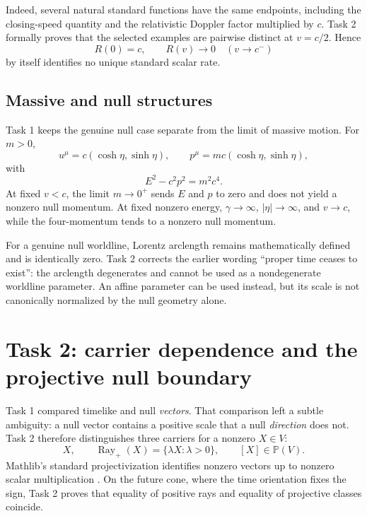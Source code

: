 \documentclass[11pt,a4paper]{article}
\newcommand{\Rayp}{\operatorname{Ray}_{+}}
\begin{document}
Indeed, several natural standard functions have the same endpoints, including the closing-speed quantity and the relativistic Doppler factor multiplied by $c$.  Task 2 formally proves that the selected examples are pairwise distinct at $v=c/2$.  Hence
\begin{equation}
 R(0)=c,
 \qquad
 R(v)\to0\quad(v\to c^-)
\end{equation}
by itself identifies no unique standard scalar rate.

\subsection{Massive and null structures}

Task 1 keeps the genuine null case separate from the limit of massive motion.  For $m>0$,
\begin{equation}
 u^\mu=c(\cosh\eta,\sinh\eta),
 \qquad
 p^\mu=mc(\cosh\eta,\sinh\eta),
\end{equation}
with
\begin{equation}
 E^2-c^2p^2=m^2c^4.
\end{equation}
At fixed $v<c$, the limit $m\to0^+$ sends $E$ and $p$ to zero and does not yield a nonzero null momentum.  At fixed nonzero energy, $\gamma\to\infty$, $|\eta|\to\infty$, and $v\to c$, while the four-momentum tends to a nonzero null momentum.

For a genuine null worldline, Lorentz arclength remains mathematically defined and is identically zero.  Task 2 corrects the earlier wording ``proper time ceases to exist'': the arclength degenerates and cannot be used as a nondegenerate worldline parameter.  An affine parameter can be used instead, but its scale is not canonically normalized by the null geometry alone.

\section{Task 2: carrier dependence and the projective null boundary}

Task 1 compared timelike and null \emph{vectors}.  That comparison left a subtle ambiguity: a null vector contains a positive scale that a null \emph{direction} does not.  Task 2 therefore distinguishes three carriers for a nonzero $X\in V$:
\begin{equation}
 X,
 \qquad
 \Rayp(X)=\{\lambda X:\lambda>0\},
 \qquad
 [X]\in\mathbb P(V).
\end{equation}
Mathlib's standard projectivization identifies nonzero vectors up to nonzero scalar multiplication \cite{MathlibProjectivization}.  On the future cone, where the time orientation fixes the sign, Task 2 proves that equality of positive rays and equality of projective classes coincide.
\end{document}
